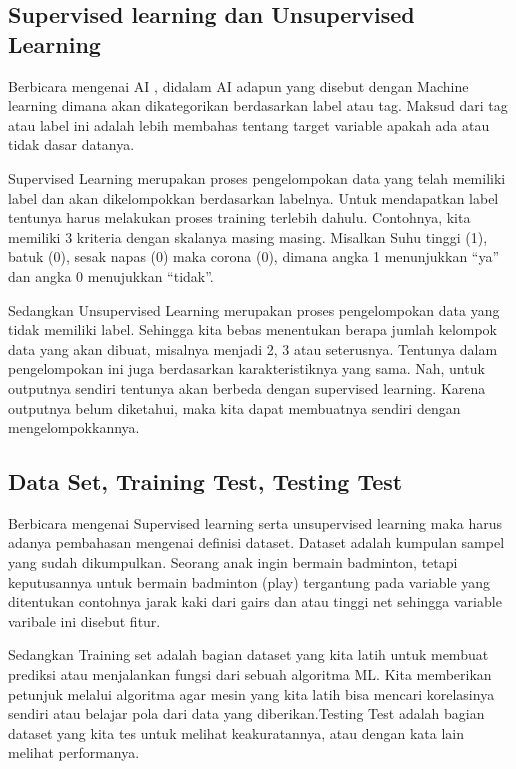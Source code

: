 \subsection{Supervised learning dan Unsupervised Learning}
\hspace{1cm} Berbicara mengenai AI , didalam AI adapun yang disebut dengan Machine learning dimana akan dikategorikan berdasarkan label atau tag. Maksud dari tag atau label ini adalah lebih membahas tentang target variable apakah ada atau tidak dasar datanya. 
 
\hspace{1cm} Supervised Learning merupakan proses pengelompokan data yang telah memiliki label dan akan dikelompokkan berdasarkan labelnya. Untuk mendapatkan label tentunya harus melakukan proses training terlebih dahulu. Contohnya, kita memiliki 3 kriteria dengan skalanya masing masing. Misalkan Suhu tinggi (1), batuk (0), sesak napas (0) maka corona (0), dimana angka 1 menunjukkan “ya” dan angka 0 menujukkan “tidak”.

\hspace{1cm} Sedangkan Unsupervised Learning merupakan proses pengelompokan data yang tidak memiliki label. Sehingga kita bebas menentukan berapa jumlah kelompok data yang akan dibuat, misalnya menjadi 2, 3 atau seterusnya. Tentunya dalam pengelompokan ini juga berdasarkan karakteristiknya yang sama. Nah, untuk outputnya sendiri tentunya akan berbeda dengan supervised learning. Karena outputnya belum diketahui, maka kita dapat membuatnya sendiri dengan mengelompokkannya.

\subsection{Data Set, Training Test, Testing Test}
\hspace{1cm} Berbicara mengenai Supervised learning serta unsupervised learning maka harus adanya pembahasan mengenai definisi dataset. Dataset adalah kumpulan sampel yang sudah dikumpulkan. Seorang anak ingin bermain badminton, tetapi keputusannya untuk bermain badminton (play) tergantung pada variable yang ditentukan contohnya jarak kaki dari gairs dan atau tinggi net sehingga variable varibale ini disebut fitur.

\hspace{1cm} Sedangkan Training set adalah bagian dataset yang kita latih untuk membuat prediksi atau menjalankan fungsi dari sebuah algoritma ML. Kita memberikan petunjuk melalui algoritma agar mesin yang kita latih bisa mencari korelasinya sendiri atau belajar pola dari data yang diberikan.Testing Test adalah bagian dataset yang kita tes untuk melihat keakuratannya, atau dengan kata lain melihat performanya.


